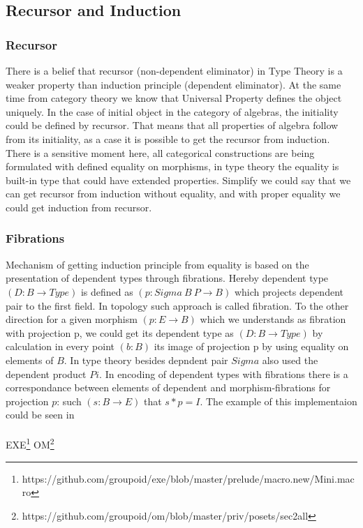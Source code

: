 \documentclass[11pt,oneside]{article}
\begin{document}

\newpage
\subsection{Recursor and Induction}
\subsubsection{Recursor}

There is a belief that recursor (non-dependent eliminator) in Type Theory
is a weaker property than induction principle (dependent eliminator). At the same time
from category theory we know that Universal Property defines the object uniquely.
In the case of initial object in the category of algebras, the initiality could be defined by recursor.
That means that all properties of algebra follow from its initiality,
as a case it is possible to get the recursor from induction. There is a sensitive moment here,
all categorical constructions are being formulated with defined equality on morphisms,
in type theory the equality is built-in type that could have extended properties. Simplify we could say
that we can get recursor from induction without equality, and with proper equality we could get induction from recursor.

\subsubsection{Fibrations}

Mechanism of getting induction principle from equality is based on the presentation
of dependent types through fibrations. Hereby dependent type $(D: B \rightarrow Type)$ is defined as $(p: Sigma\ B\ P \rightarrow B)$
which projects dependent pair to the first field. In topology such approach is called fibration.
To the other direction for a given morphism $(p: E \rightarrow B)$ which we understands as fibration with projection p,
we could get its dependent type as $(D: B \rightarrow Type)$ by calculation in every point $(b: B)$ its image of
projection p by using equality on elements of $B$. In type theory besides depndent pair $Sigma$ also
used the dependent product $Pi$. In encoding of dependent types with fibrations there is a correspondance
between elements of dependent and morphism-fibrations for projection $p$: such $(s: B \rightarrow E)$ that $s * p = I$.
The example of this implementaion could be seen in\\
\\
EXE\footnote{https://github.com/groupoid/exe/blob/master/prelude/macro.new/Mini.macro}
OM\footnote{https://github.com/groupoid/om/blob/master/priv/posets/sec2all}
\end{document}
